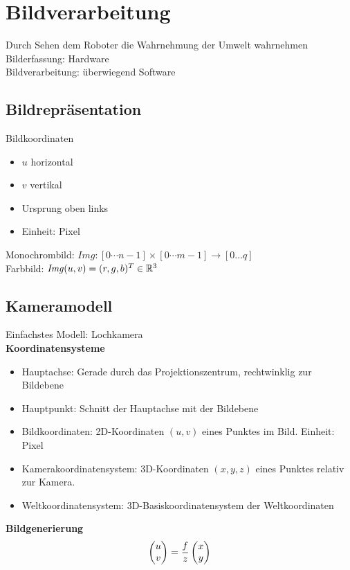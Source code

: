 

\section{Bildverarbeitung}%
\label{bv:sec:bildverarbeitung}
Durch Sehen dem Roboter die Wahrnehmung der Umwelt wahrnehmen\\
Bilderfassung: Hardware\\
Bildverarbeitung: überwiegend Software

\subsection{Bildrepräsentation}%
\label{bv:sub:bildrepraesentation}
Bildkoordinaten
\begin{itemize}
\item \(u\) horizontal
\item \(v\) vertikal
\item Ursprung oben links
\item Einheit: Pixel
\end{itemize}

Monochrombild: \(\mathit{Img}: [0 \cdots n - 1] \times [0 \cdots m-1] \rightarrow [0\dots q]\)\\
Farbbild: \(\mathit{Img}(u,v) = (r,g,b)^T \in \mathbb{R}^3\)

\subsection{Kameramodell}%
\label{bv:sub:kameramodell}
Einfachstes Modell: Lochkamera\\

\textbf{Koordinatensysteme}
\begin{itemize}
\item Hauptachse: Gerade durch das Projektionszentrum, rechtwinklig zur Bildebene
\item Hauptpunkt: Schnitt der Hauptachse mit der Bildebene
\item Bildkoordinaten: 2D-Koordinaten \((u, v)\) eines Punktes im Bild. Einheit: Pixel
\item Kamerakoordinatensystem: 3D-Koordinaten \((x, y, z)\) eines Punktes relativ zur Kamera.
\item Weltkoordinatensystem: 3D-Basiskoordinatensystem der Weltkoordinaten
\end{itemize}

\textbf{Bildgenerierung}\\
\[\begin{pmatrix}u \\ v\end{pmatrix} = \frac{f}{z}\begin{pmatrix}x \\ y\end{pmatrix}\]

